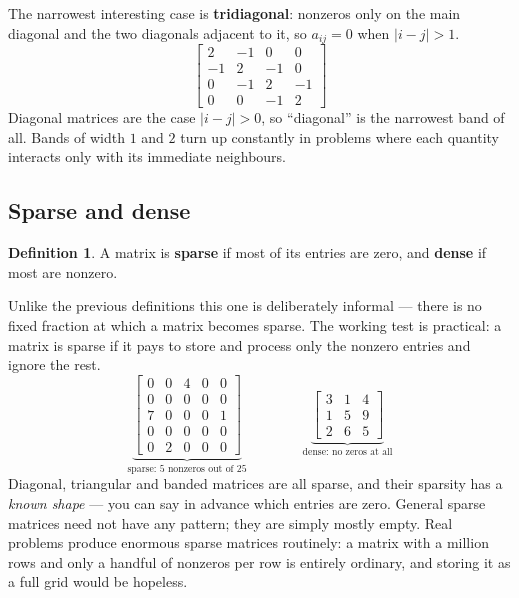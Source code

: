 \documentclass[11pt]{article}
\theoremstyle{plain}
\theoremstyle{definition}
\newtheorem{defn}{Definition}[section]
\theoremstyle{remark}
\begin{document}
\noindent The narrowest interesting case is \textbf{tridiagonal}: nonzeros only
on the main diagonal and the two diagonals adjacent to it, so $a_{ij}=0$ when
$|i-j|>1$.
\[
  \begin{bmatrix}
     2&-1& 0& 0\\
    -1& 2&-1& 0\\
     0&-1& 2&-1\\
     0& 0&-1& 2
  \end{bmatrix}
\]
Diagonal matrices are the case $|i-j|>0$, so ``diagonal'' is the narrowest band
of all. Bands of width $1$ and $2$ turn up constantly in problems where each
quantity interacts only with its immediate neighbours.

\subsection{Sparse and dense}
\begin{defn}
A matrix is \textbf{sparse} if most of its entries are zero, and \textbf{dense}
if most are nonzero.
\end{defn}

\noindent Unlike the previous definitions this one is deliberately informal ---
there is no fixed fraction at which a matrix becomes sparse. The working test is
practical: a matrix is sparse if it pays to store and process only the nonzero
entries and ignore the rest.
\[
  \underbrace{\begin{bmatrix}
    0&0&4&0&0\\
    0&0&0&0&0\\
    7&0&0&0&1\\
    0&0&0&0&0\\
    0&2&0&0&0
  \end{bmatrix}}_{\text{sparse: }5\text{ nonzeros out of }25}
  \qquad\qquad
  \underbrace{\begin{bmatrix}
    3&1&4\\1&5&9\\2&6&5
  \end{bmatrix}}_{\text{dense: no zeros at all}}
\]
Diagonal, triangular and banded matrices are all sparse, and their sparsity has
a \emph{known shape} --- you can say in advance which entries are zero. General
sparse matrices need not have any pattern; they are simply mostly empty. Real
problems produce enormous sparse matrices routinely: a matrix with a million
rows and only a handful of nonzeros per row is entirely ordinary, and storing it
as a full grid would be hopeless.
\end{document}
